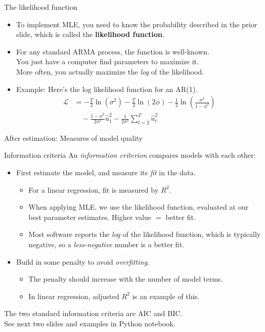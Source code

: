 \documentclass[t,12pt]{beamer}
\begin{document}
\begin{frame}[c]{The likelihood function}
\begin{itemize}
\item To implement MLE, you need to know the probability described in the prior slide, which is called the \textbf{likelihood function}. 
\medskip
\item For any standard ARMA process, the function is well-known.
\\ You just have a computer find parameters to maximize it.
\\ More often, you actually maximize the \emph{log} of the likelihood.
\medskip
\item Example: Here's the log likelihood function for an AR(1).
\begin{align*}
\mathscr{L} &= - \frac{T}{2}\ln(\sigma^2) - \frac{T}{2}\ln(2\phi) - \frac{1}{2}\ln\left(\frac{\sigma^2}{1-\phi^2}\right) 
\\ & \quad - \frac{1-\phi^2}{2\sigma^2}\hat{u}_1^2 - \frac{1}{2\sigma^2}\sum_{t=2}^T \hat{u}_t^2
\end{align*}
\end{itemize}
\end{frame}

\begin{frame}[c]
\vfill
\centerline{After estimation: Measures of model quality}
\vfill
\end{frame}

\begin{frame}[c]{Information criteria}
An \emph{information criterion} compares models with each other:
\begin{itemize}
\medskip
\item First estimate the model, and measure its \emph{fit} in the data. 
\begin{itemize}
\item For a linear regression, fit is measured by $R^2$. 
\item When applying MLE, we use the likelihood function, evaluated at our best parameter estimates. 
Higher value $=$ better fit.
\item Most software reports the \emph{log} of the likelihood function, which is typically negative, so a \emph{less-negative} number is a better fit.
\end{itemize}
\medskip
\item Build in some penalty to avoid \emph{overfitting}.
\begin{itemize}
\item The penalty should increase with the number of model terms.
\item In linear regression, adjusted $R^2$ is an example of this.
\end{itemize}
\end{itemize}
\medskip
The two standard information criteria are AIC and BIC.
\\ See next two slides and examples in Python notebook.
\end{frame}
\end{document}
